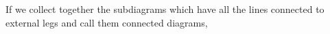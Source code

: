 \documentclass[11pt]{article}
\renewcommand{\c}[1]{c_\mathbf{#1}}
\numberwithin{equation}{section}
\begin{document}


If we collect together the subdiagrams which have all the lines connected to external legs and call them connected diagrams,
\end{document}
